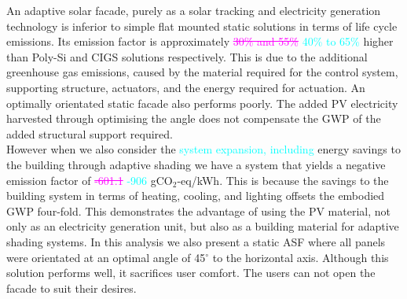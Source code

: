 
An adaptive solar facade, purely as a solar tracking and electricity generation technology is inferior to simple flat mounted static solutions in terms of life cycle emissions. Its emission factor is approximately \textcolor{magenta}{\sout{30\% and 55\% }} \textcolor{cyan}{40\% to 65\%} higher than Poly-Si and CIGS solutions respectively. This is due to the additional greenhouse gas emissions, caused by the material required for the control system, supporting structure, actuators, and the energy required for actuation. An optimally orientated static facade also performs poorly. The added PV electricity harvested through optimising the angle does not compensate the GWP of the added structural support required.\\

However when we also consider the \textcolor{cyan}{system expansion, including} energy savings to the building through adaptive shading we have a system that yields a negative emission factor of \textcolor{magenta}{\sout{ -601.1}} \textcolor{cyan}{-906} gCO$_{2}$-eq/kWh. This is because the savings to the building system in terms of heating, cooling, and lighting offsets the embodied GWP four-fold. This demonstrates the advantage of using the PV material, not only as an electricity generation unit, but also as a building material for adaptive shading systems. In this analysis we also present a static ASF where all panels were orientated at an optimal angle of 45$^{\circ}$ to the horizontal axis. Although this solution performs well, it sacrifices user comfort. The users can not open the facade to suit their desires.\\


